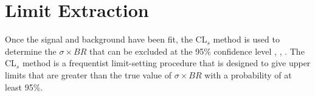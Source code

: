





\section{Limit Extraction}
Once the signal and background have been fit, the CL$_s$ method is used to 
determine the $\sigma\times BR$ that can be excluded at the 95\% confidence
level \cite{CLS1}, \cite{CLS2}, \cite{CLS3}.  The CL$_s$ method is a
frequentist limit-setting procedure that is designed to give upper limits that
are greater than the true value of $\sigma\times BR$ with a probability of at
least 95\%.

